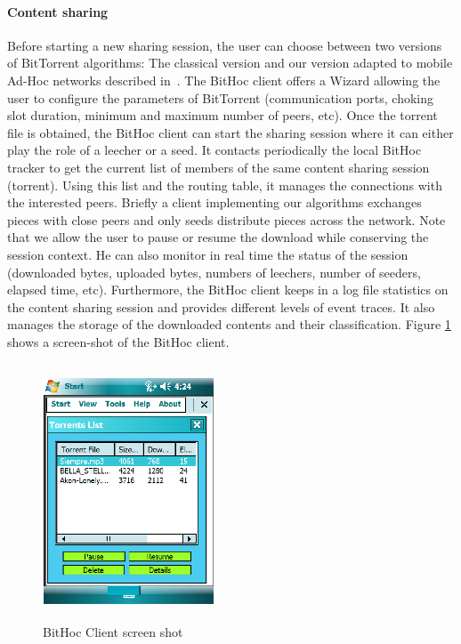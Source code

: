 \paragraph{Content sharing}

Before starting a new sharing session, the user can choose between two versions of BitTorrent algorithms: The classical version \cite{RefBT} and our version adapted to mobile Ad-Hoc networks described in~\cite{BitHoc}. The BitHoc client offers a Wizard allowing the user to configure the parameters of BitTorrent (communication ports, choking slot duration, minimum and maximum number of peers, etc). Once the torrent file is obtained, the BitHoc client can start the sharing session where it can either play the role of a leecher or a seed. It contacts periodically the local BitHoc tracker to get the current list of members of the same content sharing session (torrent). Using this list and the routing table, it manages the connections with the interested peers. Briefly a client implementing our algorithms exchanges pieces with close peers and only seeds distribute pieces across the network. Note that we allow the user to pause or resume the download while conserving the session context. He can also monitor in real time the status of the session (downloaded bytes, uploaded bytes, numbers of leechers, number of seeders, elapsed time, etc). Furthermore, the BitHoc client keeps in a log file statistics on the content sharing session and provides different levels of event traces. It also manages the storage of the downloaded contents and their classification. Figure \ref{Figclient} shows a screen-shot of the BitHoc client.

\begin{figure}[!h]
  \begin{center}
    \includegraphics[width=2in,height=3in]{Chapitre2/contentsharing.png}
  \end{center}
  \caption{BitHoc Client screen shot}
  \label{Figclient}
\end{figure}

